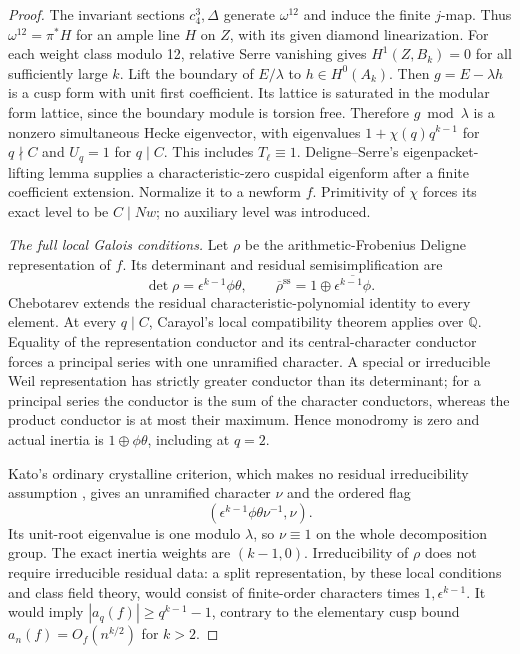 \begin{proof}
The invariant sections \(c_4^3,\Delta\) generate \(\omega^{12}\)
and induce the finite \(j\)-map.  Thus
\(\omega^{12}=\pi^*H\) for an ample line \(H\) on \(Z\),
with its given diamond linearization.  For each weight class modulo
12, relative Serre vanishing gives \(H^1(Z,B_k)=0\) for all
sufficiently large \(k\).  Lift the boundary of \(E/\lambda\)
to \(h\in H^0(A_k)\).  Then \(g=E-\lambda h\) is a cusp form
with unit first coefficient.  Its lattice is saturated in the modular
form lattice, since the boundary module is torsion free.  Therefore
\(g\bmod\lambda\) is a nonzero simultaneous Hecke eigenvector,
with eigenvalues \(1+\chi(q)q^{k-1}\) for \(q\nmid C\) and
\(U_q=1\) for \(q\mid C\).  This includes
\(T_\ell\equiv1\).
Deligne--Serre's eigenpacket-lifting lemma
\cite[Lemma 6.11]{SeedDeligneSerre} supplies a characteristic-zero
cuspidal eigenform after a finite coefficient extension.  Normalize it
to a newform \(f\).  Primitivity of \(\chi\) forces its exact
level to be \(C\mid Nw\); no auxiliary level was introduced.

\emph{The full local Galois conditions.}
Let \(\rho\) be the arithmetic-Frobenius Deligne representation
of \(f\).  Its determinant and residual semisimplification are
\[
 \det\rho=\epsilon^{k-1}\phi\theta,\qquad
 \overline\rho^{\mathrm{ss}}
       =1\oplus\overline{\epsilon^{k-1}\phi}.            \tag{AS3}
\]
Chebotarev extends the residual characteristic-polynomial identity
to every element.  At every \(q\mid C\), Carayol's local
compatibility theorem \cite[Theorem A]{SeedCarayol} applies over
\(\mathbb Q\).  Equality of the representation conductor and its
central-character conductor forces a principal series with one
unramified character.  A special or irreducible Weil representation
has strictly greater conductor than its determinant; for a principal
series the conductor is the sum of the character conductors, whereas
the product conductor is at most their maximum.  Hence monodromy
is zero and actual inertia is \(1\oplus\phi\theta\), including
at \(q=2\).

Kato's ordinary crystalline criterion, which makes no residual
irreducibility assumption \cite[Proposition 17.1 and Section 17.7]{SeedKato},
gives an unramified character \(\nu\) and the ordered flag
\[
              (\epsilon^{k-1}\phi\theta\nu^{-1},\nu).
                                                               \tag{AS4}
\]
Its unit-root eigenvalue is one modulo \(\lambda\), so
\(\nu\equiv1\) on the whole decomposition group.  The exact
inertia weights are \((k-1,0)\).
Irreducibility of \(\rho\) does not require irreducible residual
data: a split representation, by these local conditions and class
field theory, would consist of finite-order characters times
\(1,\epsilon^{k-1}\).  It would imply
\(|a_q(f)|\geq q^{k-1}-1\), contrary to the elementary cusp bound
\(a_n(f)=O_f(n^{k/2})\) for \(k>2\).


\end{proof}
